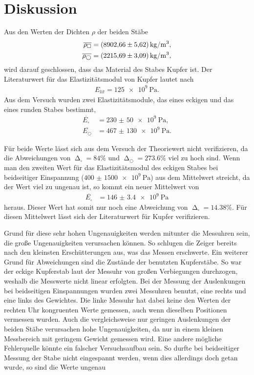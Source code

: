 \section{Diskussion}
\label{sec:Diskussion}

Aus den Werten der Dichten $\rho$ der beiden Stäbe
\begin{align*}
    \overline{\rho_\square} &= \SI{8902.66 (5.62)}{\kilo\gram\per\meter^3}, \\
    \overline{\rho_\bigcirc} &= \SI{2215.69 (3.09)}{\kilo\gram\per\meter^3},
\end{align*}
wird darauf geschlossen, dass das Material des Stabes Kupfer ist.
Der Literaturwert für das Elastizitätsmodul von Kupfer lautet nach \cite{czichos}
\begin{align*}
    E_{lit} = \SI{125e9}{\Pa}.
\end{align*}
Aus dem Versuch wurden zwei Elastizitätsmodule, das eines eckigen und das eines runden Stabes bestimmt,
\begin{align*}
    \overline{E_{\square}} &= \SI{230(50)e9}{\Pa}, \\
    \overline{E_{\bigcirc}} &= \SI{467(130)e9}{\Pa}.
\end{align*}

\sloppy
Für beide Werte lässt sich aus dem Versuch der Theoriewert nicht verifizieren, da die Abweichungen von
$\upDelta_{\square} = 84 \%$ und $\upDelta_{\bigcirc} = 273.6 \%$ viel zu hoch sind.
Wenn man den zweiten Wert für das Elastizitätsmodul des eckigen Stabes bei beidseitiger Einspannung ($\SI{400(1500)e9}{\Pa}$)
aus dem Mittelwert streicht, da der Wert viel zu ungenau ist, so kommt ein neuer Mittelwert von
\begin{align*}
    \overline{E_{\square}} &= \SI{146(3.4)e9}{\Pa}
\end{align*}
heraus. Dieser Wert hat somit nur noch eine Abweichung von $\upDelta_{\square} = 14.38 \%$.
Für diesen Mittelwert lässt sich der Literaturwert für Kupfer verifizieren.

Grund für diese sehr hohen Ungenauigkeiten werden mitunter die Messuhren sein, die große Ungenauigkeiten verursachen können.
So schlugen die Zeiger bereits nach den kleinsten Erschütterungen aus, was das Messen erschwerte. 
Ein weiterer Grund für Abweichungen sind die Zustände der benutzten Kupferstäbe. So war der eckige Kupferstab laut der Messuhr
von großen Verbiegungen durchzogen, weshalb die Messwerte nicht linear erfolgten.
Bei der Messung der Auslenkungen bei beidseitigen Einspannungen wurden zwei Messuhren benutzt, eine rechts und eine links des Gewichtes.
Die linke Messuhr hat dabei keine den Werten der rechten Uhr kongruenten Werte gemessen, auch wenn dieselben Positionen vermessen wurden.
Auch die vergleichsweise nur geringen Auslenkungen der beiden Stäbe verursachen hohe Ungenauigkeiten, da nur in einem
kleinen Messbereich mit geringem Gewicht gemessen wird.
Eine andere mögliche Fehlerquelle könnte ein falscher Versuchsaufbau sein. So durfte bei beidseitiger Messung der Stabe nicht
eingespannt werden, wenn dies allerdings doch getan wurde, so sind die Werte ungenau


